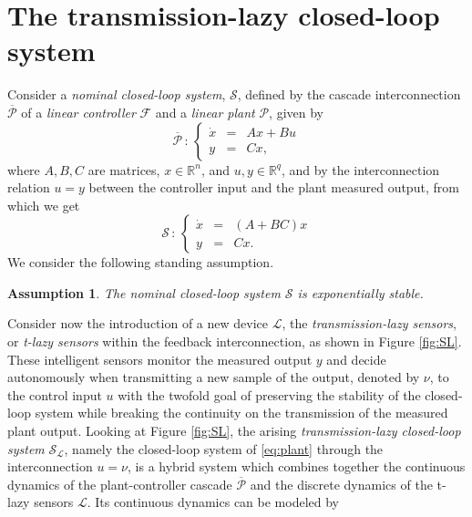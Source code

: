 \documentclass[twocolumn]{autart}
\newtheorem{assumption}{Assumption}
\newcommand{\realn}{\real^n}
\newcommand\real{\ensuremath{{\mathbb R}}}
\begin{document}
\section{The transmission-lazy closed-loop system} 
\label{sec:model}
Consider a \emph{nominal closed-loop system}, $\mathcal{S}$, defined by  
the cascade interconnection $\overline{\mathcal{P}}$ 
of a \emph{linear controller} $\mathcal{F}$ and a \emph{linear plant} 
$\mathcal{P}$, given by
\begin{equation}
 \overline{\mathcal{P}}\,:\,\left\{
	\begin{array}{rcl}
	 \dot{x} & = & Ax+Bu \\
			y	& = & Cx,
	\end{array}
\right.\label{eq:plant}
\end{equation}
where $A,B,C$ are matrices, $x\in\realn$, and $u,y\in\real^q$, 
and by the interconnection relation $u=y$ 
between the controller input and the plant measured output, 
from which we get
\begin{equation}
 \mathcal{S}\,:\,\left\{
	\begin{array}{rcl}
	 \dot{x} & = & \left(A+BC\right)x \\
			y	& = & Cx.
	\end{array}
\right.\label{eq:nominal_cls}
\end{equation}
We consider the following standing assumption.
\begin{assumption} 
\label{assume:well-posed}
 The nominal closed-loop system $\mathcal{S}$ 
is exponentially stable.
\end{assumption}
Consider now the introduction of a new device $\mathcal{L}$, 
the \emph{transmission-lazy sensors}, or {\em t-lazy sensors} within the feedback interconnection, 
as shown in Figure \ref{fig:SL}. These intelligent sensors
monitor the measured output $y$ and decide autonomously
when transmitting a new sample of the output, denoted by $\nu$,  
to the control input $u$ 
with the twofold goal of preserving the stability of the
closed-loop system while breaking the continuity on the transmission
of the measured plant output.
Looking at Figure \ref{fig:SL}, the arising \emph{transmission-lazy closed-loop system} $\mathcal{S}_\mathcal{L}$,
namely the closed-loop system of \eqref{eq:plant} through the 
interconnection $u = \nu$, is a hybrid system which
combines together the
continuous dynamics of the plant-controller cascade 
$\overline{\mathcal{P}}$ and the discrete dynamics of 
the t-lazy sensors $\mathcal{L}$. Its continuous dynamics can be modeled by 
\end{document}
